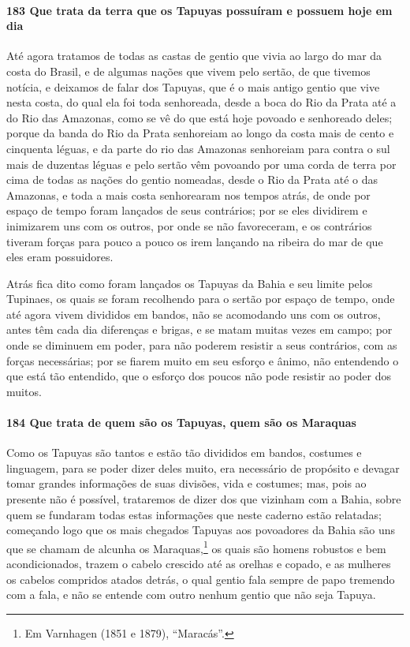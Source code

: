 \begin{linenumbers}
\paragraph{183 Que trata da terra que os Tapuyas possuíram e possuem hoje em dia}\quad
Até agora tratamos de todas as castas de gentio que vivia ao largo do mar da costa do
Brasil, e de algumas nações que vivem pelo sertão, de que tivemos notícia, e deixamos de
falar dos Tapuyas, que é o mais antigo gentio que vive nesta costa, do qual ela foi toda
senhoreada, desde a boca do Rio da Prata até a do Rio das Amazonas, como se vê do que está
hoje povoado e senhoreado deles; porque da banda do Rio da Prata senhoreiam ao longo da
costa mais de cento e cinquenta léguas, e da parte do rio das Amazonas senhoreiam para
contra o sul mais de duzentas léguas e pelo sertão vêm povoando por uma corda de terra por
cima de todas as nações do gentio nomeadas, desde o Rio da Prata até o das Amazonas, e
toda a mais costa senhorearam nos tempos atrás, de onde por espaço de tempo foram lançados
de seus contrários; por se eles dividirem e inimizarem uns com os outros, por onde se não
favoreceram, e os contrários tiveram forças para pouco a pouco os irem lançando na ribeira
do mar de que eles eram possuidores.

Atrás fica dito como foram lançados os Tapuyas da Bahia e seu limite pelos Tupinaes, os
quais se foram recolhendo para o sertão por espaço de tempo, onde até agora vivem
divididos em bandos, não se acomodando uns com os outros, antes têm cada dia diferenças e
brigas, e se matam muitas vezes em campo; por onde se diminuem em poder, para não poderem
resistir a seus contrários, com as forças necessárias; por se fiarem muito em seu esforço
e ânimo, não entendendo o que está tão entendido, que o esforço dos poucos não pode
resistir ao poder dos muitos.

\paragraph{184 Que trata de quem são os Tapuyas, quem são os Maraquas}\quad
Como os Tapuyas são tantos e estão tão divididos em bandos, costumes e linguagem, para se
poder dizer deles muito, era necessário de propósito e devagar tomar grandes informações
de suas divisões, vida e costumes; mas, pois ao presente não é possível, trataremos de
dizer dos que vizinham com a Bahia, sobre quem se fundaram todas estas informações que
neste caderno estão relatadas; começando logo que os mais chegados Tapuyas aos povoadores
da Bahia são uns que se chamam de alcunha os Maraquas,\footnote{ Em Varnhagen (1851 e
1879), ``Maracás''.} os quais são homens robustos e bem acondicionados, trazem o cabelo
crescido até as orelhas e copado, e as mulheres os cabelos compridos atados detrás, o qual
gentio fala sempre de papo tremendo com a fala, e não se entende com outro nenhum gentio
que não seja Tapuya.


\end{linenumbers}
